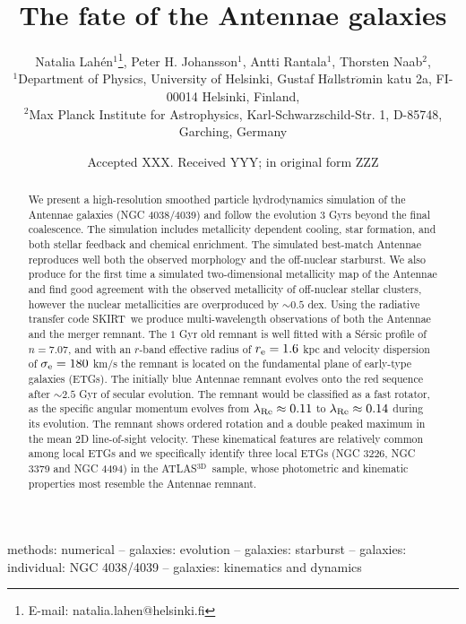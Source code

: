 \documentclass[a4paper,fleqn,usenatbib]{mnras}
\title[The fate of the Antennae galaxies]{The fate of the Antennae galaxies}
\author[N. Lah\'{e}n et al.]{Natalia Lah\'{e}n$^{1}$\thanks{E-mail: natalia.lahen@helsinki.fi}, 
Peter H. Johansson$^{1}$,
Antti Rantala$^{1}$,
Thorsten Naab$^{2}$, 
\newauthor{Matteo Frigo$^{2}$
}
\\
$^{1}$Department of Physics, University of Helsinki, Gustaf 
H$\ddot{a}$llstr$\ddot{o}$min katu 2a, FI-00014 Helsinki, Finland, \\
$^{2}$Max Planck Institute for Astrophysics, Karl-Schwarzschild-Str. 1, D-85748, Garching, Germany \\
}
\date{Accepted XXX. Received YYY; in original form ZZZ}
\newcommand{\atlas}{\textsc{ATLAS$^\mathrm{3D}$}}
\newcommand{\skirt}{\textsc{SKIRT}}
\begin{document}
\label{firstpage}
\pagerange{\pageref{firstpage}--\pageref{lastpage}}
\maketitle

\begin{abstract}

We present a high-resolution smoothed particle hydrodynamics simulation of the Antennae galaxies (NGC 4038/4039) and follow the evolution
$3$ Gyrs beyond the final coalescence. The simulation includes metallicity dependent cooling, star formation, and both stellar feedback and chemical
enrichment. The simulated best-match Antennae reproduces well both the observed morphology and
the off-nuclear starburst. We also produce for the first time a simulated two-dimensional metallicity 
map of the Antennae and find good agreement with the observed metallicity of off-nuclear stellar clusters, 
however the nuclear metallicities are overproduced by $\sim 0.5$ dex. 
Using the radiative transfer code \skirt\ we produce multi-wavelength observations of both the Antennae and the 
merger remnant. The $1$ Gyr old remnant is well fitted with a S\'{e}rsic profile of $n=7.07$, and with an $r$-band effective radius of
$r_{\rm e}= 1.6$ kpc and velocity dispersion of $\sigma_{\rm e}=180$ km$/$s the remnant is located on the fundamental plane of 
early-type galaxies (ETGs). The initially blue Antennae 
remnant evolves onto the red sequence after $\sim 2.5$ Gyr of secular evolution. The remnant would be classified as a fast rotator, 
as the specific angular momentum evolves from $\lambda_{\rm{Re}}\approx0.11$ to $\lambda_{\rm{Re}}\approx0.14$ during its evolution.
The remnant shows ordered rotation and a double peaked maximum in the mean 2D line-of-sight velocity. 
These kinematical features are relatively common among local ETGs and we specifically identify  three local 
ETGs (NGC 3226, NGC 3379 and NGC 4494) in the \atlas\ sample,  whose photometric and kinematic properties most resemble the Antennae remnant. 

\end{abstract}

\begin{keywords}
methods: numerical -- galaxies: evolution -- galaxies: starburst -- galaxies: individual: NGC 4038/4039 -- galaxies: kinematics and dynamics
\end{keywords}
\end{document}
